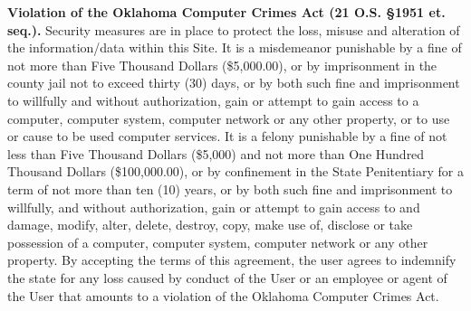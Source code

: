 \textbf{Violation of the Oklahoma Computer Crimes Act (21 O.S. §1951 et. seq.).}
Security measures are in place to protect the loss, misuse and alteration of the
information/data within this Site. It is a misdemeanor punishable by a fine of
not more than Five Thousand Dollars (\$5,000.00), or by imprisonment in the
county jail not to exceed thirty (30) days, or by both such fine and
imprisonment to willfully and without authorization, gain or attempt to gain
access to a computer, computer system, computer network or any other property,
or to use or cause to be used computer services. It is a felony punishable by a
fine of not less than Five Thousand Dollars (\$5,000) and not more than One
Hundred Thousand Dollars (\$100,000.00), or by confinement in the State
Penitentiary for a term of not more than ten (10) years, or by both such fine
and imprisonment to willfully, and without authorization, gain or attempt to
gain access to and damage, modify, alter, delete, destroy, copy, make use of,
disclose or take possession of a computer, computer system, computer network or
any other property. By accepting the terms of this agreement, the user agrees to
indemnify the state for any loss caused by conduct of the User or an employee or
agent of the User that amounts to a violation of the Oklahoma Computer Crimes
Act.